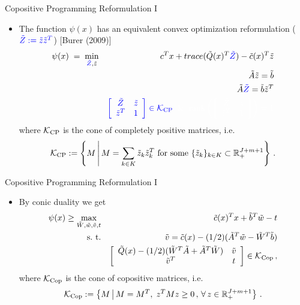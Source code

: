 \documentclass[xcolor=x11names,compress]{beamer}
\renewcommand{\(}{\begin{columns}}
\renewcommand{\)}{\end{columns}}
\newcommand{\<}[1]{\begin{column}{#1}}
\renewcommand{\>}{\end{column}}
\def\subto{{\rm s. \mbox{ }\rm t.}}
\def\min{\mathop{\rm min}}
\def\max{\mathop{\rm max}}
\newcommand{\0}{\V{0}}
\newcommand{\1}{\V{1}}
\newcommand{\mymbox}[1]{\mbox{\scriptsize #1}}
\renewcommand{\Re}{\mathbb{R}}
\newcommand{\trace}{\mathop{trace}}
\newcommand{\tQ}{\tilde{Q}(x)}
\newcommand{\tq}{\tilde{c}(x)}
\newcommand{\tA}{\tilde{A}}
\newcommand{\tb}{\tilde{b}}
\newcommand{\ty}{\tilde{z}}
\newcommand{\tY}{\tilde{Z}}
\newcommand{\tw}{\tilde{w}}
\newcommand{\tv}{\tilde{v}}
\newcommand{\tW}{\tilde{W}}
\newcommand{\copconeCompPos}{\mathcal{K}_{\mymbox{CP}}}
\newcommand{\copconeCopos}{\mathcal{K}_{\mymbox{Cop}}}
\begin{document}
\begin{frame}{Copositive Programming Reformulation I}
\begin{itemize}
\item The function $\psi(x)$ has an equivalent convex optimization reformulation (${\color{blue} \tY := \ty\ty^T}$) {\footnotesize [Burer (2009)]}
\begin{eqnarray*}
\psi(x) \;=\;\min_{{\color{blue} \tY},\ty} &&c^Tx+ \trace(\tQ^T {\color{blue} \tY})-\tq^T\ty\\
&&\tA \ty= \tb\\
&&\tA {\color{blue} \tY}= \tb\ty^T\\
&& {\color{blue} \left[\begin{array}{cc} \tY & \ty\\ \ty^T & 1\end{array}\right] \in \copconeCompPos} {\color{white}\;\;\&\;\; \mbox{rank}\left( \left[\begin{array}{cc} \tY & \ty\\ \ty^T & 1\end{array}\right]\right)=1}
\end{eqnarray*}
where  $\copconeCompPos$ is the cone of completely positive matrices, i.e.
\[\copconeCompPos := \left\{ M  \,\middle|\, M = \sum_{k\in K} \ty_k \ty_k^T \mbox{ for some } \{ \ty_k \}_{k\in K}\subset \Re_+^{J+m+1} \right\}\,.\]
\end{itemize}
\end{frame}

\begin{frame}{Copositive Programming Reformulation I}
\begin{itemize}
\item By conic duality we get
\begin{eqnarray*}
\psi(x)\geq\max_{\tW,\tw,\tv,t} && \tq^T x+ \tb^T\tw - t\\
\subto && \tv = \tq - (1/2)(\tA^T\tw-\tW^T\tb)\\
&&\left[\begin{array}{cc} \tQ - (1/2)(\tW^T \tA + \tA^T\tW) & \tv\\ \tv^T & t\end{array}\right]\in \copconeCopos\,,
\end{eqnarray*}
where $\copconeCopos$ is the cone of copositive matrices, i.e.
\[\copconeCopos:=\left\{ M  \,\middle|\, M= M^T,\;z^TMz\geq 0\,,\,\forall\,z\in\Re_+^{J+m+1}\right\}\,.\]
\end{itemize}
\end{frame}
\end{document}
